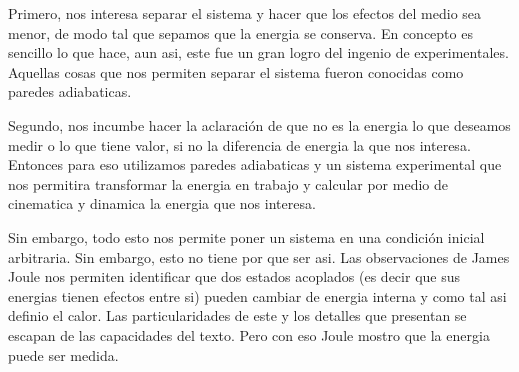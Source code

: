 \documentclass[12pt]{exam}
\begin{document}
Primero, nos interesa separar el sistema y hacer que los efectos del medio sea menor, de modo tal que sepamos que la energia se conserva. En concepto es sencillo lo que hace, aun asi, este fue un gran logro del ingenio de experimentales. Aquellas cosas que nos permiten separar el sistema fueron conocidas como paredes adiabaticas.

Segundo, nos incumbe hacer la aclaración de que no es la energia lo que deseamos medir o lo que tiene valor, si no la diferencia de energia la que nos interesa. Entonces para eso utilizamos paredes adiabaticas y un sistema experimental que nos permitira transformar la energia en trabajo y calcular por medio de cinematica y dinamica la energia que nos interesa.

Sin embargo, todo esto nos permite poner un sistema en una condición inicial arbitraria. Sin embargo, esto no tiene por que ser asi. Las observaciones de James Joule nos permiten identificar que dos estados acoplados (es decir que sus energias tienen efectos entre si) pueden cambiar de energia interna y como tal asi definio el calor. Las particularidades de este y los detalles que presentan se escapan de las capacidades del texto. Pero con eso Joule mostro que la energia puede ser medida.
\end{document}
